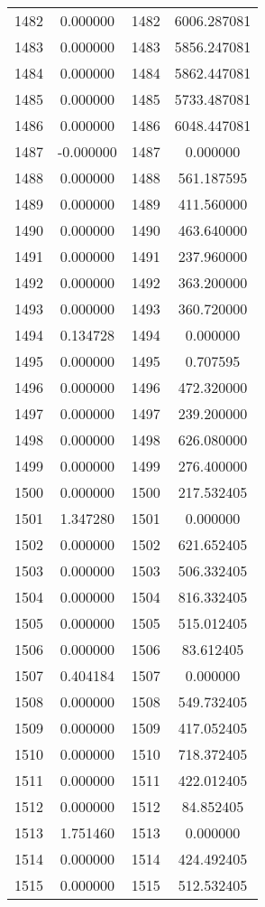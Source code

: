 \documentclass[12pt]{article}
\begin{document}
\begin{longtable}{@{}cccc@{}}
1482 & 0.000000 & 1482 & 6006.287081 \\
1483 & 0.000000 & 1483 & 5856.247081 \\
1484 & 0.000000 & 1484 & 5862.447081 \\
1485 & 0.000000 & 1485 & 5733.487081 \\
1486 & 0.000000 & 1486 & 6048.447081 \\
1487 & -0.000000 & 1487 & 0.000000 \\
1488 & 0.000000 & 1488 & 561.187595 \\
1489 & 0.000000 & 1489 & 411.560000 \\
1490 & 0.000000 & 1490 & 463.640000 \\
1491 & 0.000000 & 1491 & 237.960000 \\
1492 & 0.000000 & 1492 & 363.200000 \\
1493 & 0.000000 & 1493 & 360.720000 \\
1494 & 0.134728 & 1494 & 0.000000 \\
1495 & 0.000000 & 1495 & 0.707595 \\
1496 & 0.000000 & 1496 & 472.320000 \\
1497 & 0.000000 & 1497 & 239.200000 \\
1498 & 0.000000 & 1498 & 626.080000 \\
1499 & 0.000000 & 1499 & 276.400000 \\
1500 & 0.000000 & 1500 & 217.532405 \\
1501 & 1.347280 & 1501 & 0.000000 \\
1502 & 0.000000 & 1502 & 621.652405 \\
1503 & 0.000000 & 1503 & 506.332405 \\
1504 & 0.000000 & 1504 & 816.332405 \\
1505 & 0.000000 & 1505 & 515.012405 \\
1506 & 0.000000 & 1506 & 83.612405 \\
1507 & 0.404184 & 1507 & 0.000000 \\
1508 & 0.000000 & 1508 & 549.732405 \\
1509 & 0.000000 & 1509 & 417.052405 \\
1510 & 0.000000 & 1510 & 718.372405 \\
1511 & 0.000000 & 1511 & 422.012405 \\
1512 & 0.000000 & 1512 & 84.852405 \\
1513 & 1.751460 & 1513 & 0.000000 \\
1514 & 0.000000 & 1514 & 424.492405 \\
1515 & 0.000000 & 1515 & 512.532405 \\

\end{longtable}
\end{document}
